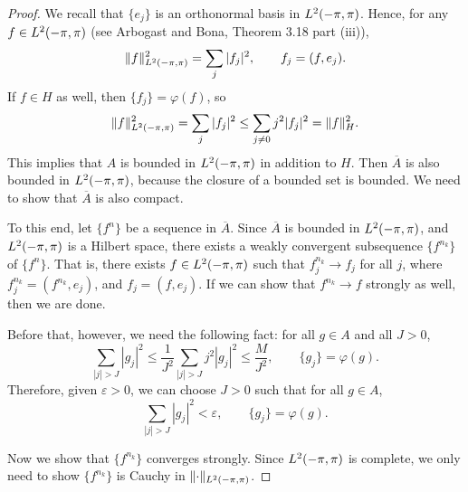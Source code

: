 \documentclass{homework}
\begin{document}
\begin{arabicparts}
\begin{proof}
			We recall that $\{e_j\}$ is an orthonormal basis in ${L^2(-\pi,\pi)}$. Hence, for any $f \in {L^2(-\pi,\pi)}$ (see Arbogast and Bona, Theorem 3.18 part (iii)),
			\begin{equation}
				\lVert f\rVert_{L^2(-\pi,\pi)}^2 = \sum_{j} |f_j|^2, \qquad f_j = (f,e_j).
			\end{equation}
			If $f \in H$ as well, then $\{f_j\} = \varphi(f)$, so
			\begin{equation}
				\lVert f\rVert_{L^2(-\pi,\pi)}^2 = \sum_{j}|f_j|^2 \le \sum_{j\ne 0}j^2|f_j|^2 = \lVert f\rVert_H^2.
			\end{equation}
			This implies that $A$ is bounded in ${L^2(-\pi,\pi)}$ in addition to $H$. Then $\overline{A}$ is also bounded in ${L^2(-\pi,\pi)}$, because the closure of a bounded set is bounded. We need to show that $\overline{A}$ is also compact.
			
			To this end, let $\{f^n\}$ be a sequence in $\overline{A}$. Since $\overline{A}$ is bounded in ${L^2(-\pi,\pi)}$, and ${L^2(-\pi,\pi)}$ is a Hilbert space, there exists a weakly convergent subsequence $\{f^{n_k}\}$ of $\{f^n\}$. That is, there exists $f \in {L^2(-\pi,\pi)}$ such that $f^{n_k}_j \to f_j$ for all $j$, where $f^{n_k}_j = (f^{n_k},e_j)$, and $f_j = (f,e_j)$. If we can show that $f^{n_k}\to f$ strongly as well, then we are done.
			
			Before that, however, we need the following fact: for all $g \in A$ and all $J > 0$,
			\begin{equation}
				\sum_{|j|> J} |g_j|^2 \le \frac{1}{J^2}\sum_{|j| > J}j^2|g_j|^2 \le \frac{M}{J^2}, \qquad \{g_j\} = \varphi(g).
			\end{equation}
			Therefore, given $\varepsilon > 0$, we can choose $J > 0$ such that for all $g \in A$,
			\begin{equation}
				\label{eq:uniform_tails}
				\sum_{|j| > J}|g_j|^2 < \varepsilon, \qquad \{g_j\}=\varphi(g).
			\end{equation}
			
			Now we show that $\{f^{n_k}\}$ converges strongly. Since ${L^2(-\pi,\pi)}$ is complete, we only need to show $\{f^{n_k}\}$ is Cauchy in $\lVert\cdot\rVert_{L^2(-\pi,\pi)}$.
			

\end{proof}
\end{arabicparts}
\end{document}
